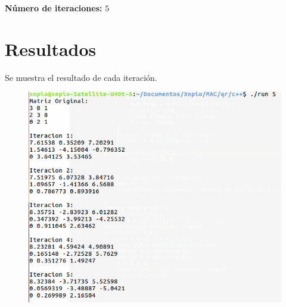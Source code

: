 \documentclass[a4paper,12pt]{article}
\begin{document}
 \textbf{Número de iteraciones:} $5$
 
\section{Resultados}

Se muestra el resultado de cada iteración.

\begin{figure}[h]
 \centering
 \includegraphics[scale=0.5]{1.png}
\end{figure}


 
\end{document}
